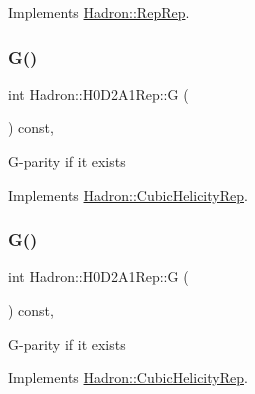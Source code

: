 Implements \mbox{\hyperlink{structHadron_1_1RepRep_a92c8802e5ed7afd7da43ccfd5b7cd92b}{Hadron\+::\+Rep\+Rep}}.

\mbox{\label{structHadron_1_1H0D2A1Rep_ae1ebac233a357e3e0be88511400434bc}} 
\subsubsection{\texorpdfstring{G()}{G()}\hspace{0.1cm}{\footnotesize\ttfamily [1/3]}}
{\footnotesize\ttfamily int Hadron\+::\+H0\+D2\+A1\+Rep\+::G (\begin{DoxyParamCaption}{ }\end{DoxyParamCaption}) const\hspace{0.3cm}{\ttfamily [inline]}, {\ttfamily [virtual]}}

G-\/parity if it exists 

Implements \mbox{\hyperlink{structHadron_1_1CubicHelicityRep_a50689f42be1e6170aa8cf6ad0597018b}{Hadron\+::\+Cubic\+Helicity\+Rep}}.

\mbox{\label{structHadron_1_1H0D2A1Rep_ae1ebac233a357e3e0be88511400434bc}} 
\subsubsection{\texorpdfstring{G()}{G()}\hspace{0.1cm}{\footnotesize\ttfamily [2/3]}}
{\footnotesize\ttfamily int Hadron\+::\+H0\+D2\+A1\+Rep\+::G (\begin{DoxyParamCaption}{ }\end{DoxyParamCaption}) const\hspace{0.3cm}{\ttfamily [inline]}, {\ttfamily [virtual]}}

G-\/parity if it exists 

Implements \mbox{\hyperlink{structHadron_1_1CubicHelicityRep_a50689f42be1e6170aa8cf6ad0597018b}{Hadron\+::\+Cubic\+Helicity\+Rep}}.

\mbox{\label{structHadron_1_1H0D2A1Rep_ae1ebac233a357e3e0be88511400434bc}} 
